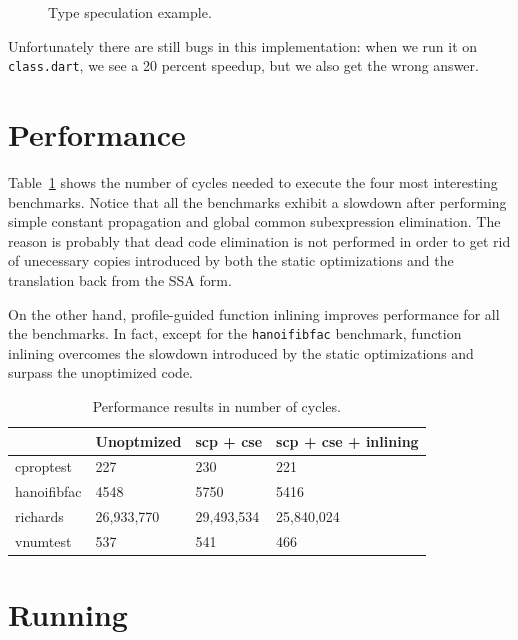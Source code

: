 \documentclass[10pt,twocolumn]{article}
\begin{document}
\begin{figure}
\begin{center}
\begin{minipage}{0.95\columnwidth}
  \caption{\label{fig:hammock} Type speculation example.}
\end{minipage}
\end{center}
\end{figure}

Unfortunately there are still bugs in this implementation: when we run
it on \texttt{class.dart}, we see a 20 percent speedup, but we also get the
wrong answer.

\section{Performance}

Table~\ref{results} shows the number of cycles needed to execute the four
most interesting benchmarks. Notice that all the benchmarks exhibit a slowdown
after performing simple constant propagation and global common subexpression elimination.
The reason is probably that dead code elimination is not performed in order
to get rid of unecessary copies introduced by both the static optimizations and the translation
back from the SSA form.

On the other hand, profile-guided function inlining improves performance for all the benchmarks.
In fact, except for the \texttt{hanoifibfac} benchmark, function inlining overcomes the slowdown
introduced by the static optimizations and surpass the unoptimized code.

\begin{table}
\begin{tabular}{|l|l|l|l|} \hline
~           & \textbf{Unoptmized} & \textbf{scp + cse}  & \textbf{scp + cse + inlining} \\ \hline
cproptest   & 227        & 230        & 221                  \\ \hline
hanoifibfac & 4548       & 5750       & 5416                 \\ \hline
richards    & 26,933,770 & 29,493,534 & 25,840,024           \\ \hline
vnumtest    & 537        & 541        & 466                  \\ \hline
\end{tabular}
\caption{Performance results in number of cycles.}
\label{results}
\end{table}


\section{Running}
\end{document}
